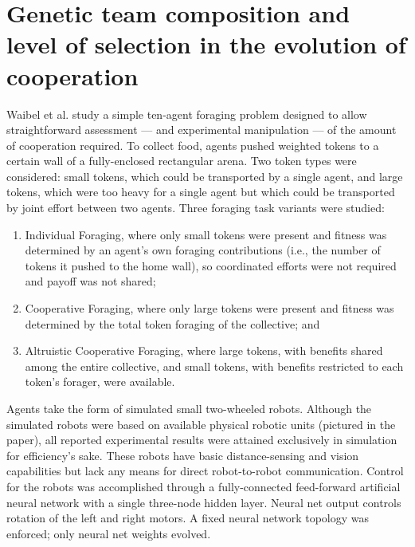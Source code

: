 \section{Genetic team composition and level of selection in the evolution of cooperation \cite{waibel2009genetic}}

Waibel et al. study a simple ten-agent foraging problem designed to allow straightforward assessment --- and experimental manipulation --- of the amount of cooperation required.
To collect food, agents pushed weighted tokens to a certain wall of a fully-enclosed rectangular arena.
Two token types were considered: small tokens, which could be transported by a single agent, and large tokens, which were too heavy for a single agent but which could be transported by joint effort between two agents.
Three foraging task variants were studied:
\begin{enumerate}
\item Individual Foraging, where only small tokens were present and fitness was determined by an agent's own foraging contributions (i.e., the number of tokens it pushed to the home wall), so coordinated efforts were not required and payoff was not shared;
\item Cooperative Foraging, where only large tokens were present and fitness was determined by the total token foraging of the collective; and
\item Altruistic Cooperative Foraging, where large tokens, with benefits shared among the entire collective, and small tokens, with benefits restricted to each token's forager, were available.
\end{enumerate}

Agents take the form of simulated small two-wheeled robots.
Although the simulated robots were based on available physical robotic units (pictured in the paper), all reported experimental results were attained exclusively in simulation for efficiency's sake.
These robots have basic distance-sensing and vision capabilities but lack any means for direct robot-to-robot communication.
Control for the robots was accomplished through a fully-connected feed-forward artificial neural network with a single three-node hidden layer.
Neural net output controls rotation of the left and right motors.
A fixed neural network topology was enforced; only neural net weights evolved.

